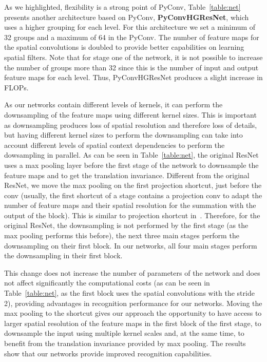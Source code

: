\documentclass{article}
\begin{document}
As we highlighted, flexibility is a strong point of PyConv, Table~\ref{table:net} presents another architecture based on PyConv, {\bf PyConvHGResNet}, which uses a higher grouping for each level. For this architecture we set a minimum of 32 groups and a maximum of 64 in the PyConv. The number of feature maps for the spatial convolutions is doubled to provide better capabilities on learning spatial filters.  Note that for  stage one of the network, it is not possible to increase the number of groups more than 32 since this is the number of input and output feature maps for each level. Thus, PyConvHGResNet produces a slight increase in FLOPs.

As our networks contain different levels of kernels, it can perform the downsampling of the feature maps using different kernel sizes. This is important as downsampling produces loss of spatial resolution and therefore loss of details, but having different kernel sizes to perform the downsampling can take into account different levels of spatial context dependencies to perform the dowsampling in parallel. As can be seen in Table~\ref{table:net}, the original ResNet~\cite{he2016deep} uses a max pooling layer before the first stage of the network to downsample the feature maps and to get the translation invariance. Different from the original ResNet, we move the max pooling on the first projection shortcut,  just before the  conv (usually, the first shortcut of a stage contains a projection  conv to adapt the number of feature maps and their spatial resolution for the summation with the output of the block). This is similar to projection shortcut in~\cite{duta2020improved}.
Therefore, for the original ResNet, the downsampling is not performed by the first stage (as the max pooling performs this before), the next three main stages perform the downsampling on their first block. In our networks, all four main stages perform the downsampling in their first block. 

This change does not increase the number of parameters of the network and does not affect significantly the computational costs (as can be seen in Table~\ref{table:net}, as the first block uses the spatial convolutions with the stride 2), providing advantages in recognition performance for our networks.
Moving the max pooling to the shortcut gives our approach the opportunity  to have access to larger spatial resolution of the feature maps in the first block of the first stage, to downsample the input using multiple kernel scales and, at the same time, to benefit from the translation invariance provided by max pooling. The results show that our networks provide improved recognition capabilities.
\end{document}
